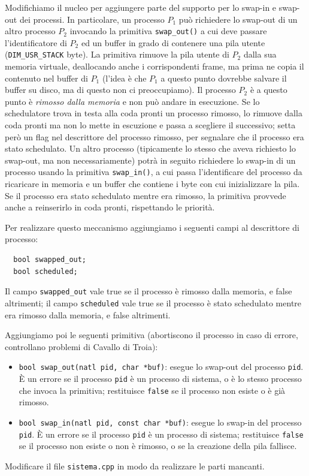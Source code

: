 Modifichiamo il nucleo per aggiungere parte del supporto per lo swap-in e swap-out dei processi.
In particolare, un processo $P_1$ pu\`o richiedere lo swap-out di un altro processo $P_2$ invocando
la primitiva \verb|swap_out()| a cui deve passare l'identificatore di $P_2$ ed un buffer
in grado di contenere una pila utente (\verb|DIM_USR_STACK| byte). La primitiva rimuove
la pila utente di $P_2$ dalla sua memoria virtuale, deallocando anche i corrispondenti frame,
ma prima ne copia il contenuto nel buffer di $P_1$ (l'idea \`e che $P_1$ a questo
punto dovrebbe salvare il buffer su disco, ma di questo non ci preoccupiamo).
Il processo $P_2$ \`e a questo punto \`e {\em rimosso dalla memoria} e non pu\`o andare in esecuzione.
Se lo schedulatore trova in testa alla coda pronti un processo rimosso, lo rimuove dalla coda
pronti ma non lo mette in escuzione e passa a scegliere il successivo; setta per\`o un flag
nel descrittore del processo rimosso, per segnalare che il processo era stato schedulato.
Un altro processo (tipicamente lo stesso che aveva richiesto lo swap-out, ma non necessariamente)
potr\`a in seguito richiedere lo swap-in di un processo usando la primitiva
\verb|swap_in()|, a cui passa l'identificare del processo da ricaricare in memoria e un buffer
che contiene i byte con cui inizializzare la pila. Se il processo era stato schedulato
mentre era rimosso, la primitiva provvede anche a reinserirlo in coda pronti, rispettando
le priorit\`a.

Per realizzare questo meccanismo aggiungiamo i seguenti campi al descrittore di processo:
\begin{verbatim}
  bool swapped_out;
  bool scheduled;
\end{verbatim}
Il campo \verb|swapped_out| vale true se il processo \`e rimosso dalla memoria, e false altrimenti;
il campo \verb|scheduled| vale true se il processo \`e stato schedulato mentre era rimosso dalla memoria,
e false altrimenti.

Aggiungiamo poi le seguenti primitiva (abortiscono il processo in caso di errore, controllano
problemi di Cavallo di Troia):
\begin{itemize}
 \item \verb|bool swap_out(natl pid, char *buf)|: esegue lo swap-out del processo \verb|pid|.
 \`E un errore se il processo \verb|pid| \`e un processo di sistema, o \`e lo stesso
 processo che invoca la primitiva; restituisce \verb|false| se il processo non esiste
 o \`e gi\`a rimosso.
 \item \verb|bool swap_in(natl pid, const char *buf)|: esegue lo swap-in del processo \verb|pid|.
 \`E un errore se il processo \verb|pid| \`e un processo di sistema;
 restituisce \verb|false| se il processo non esiste o non \`e rimosso, o se la creazione della pila
 fallisce.
\end{itemize}
Modificare il file \verb|sistema.cpp| in modo da realizzare le parti mancanti.
